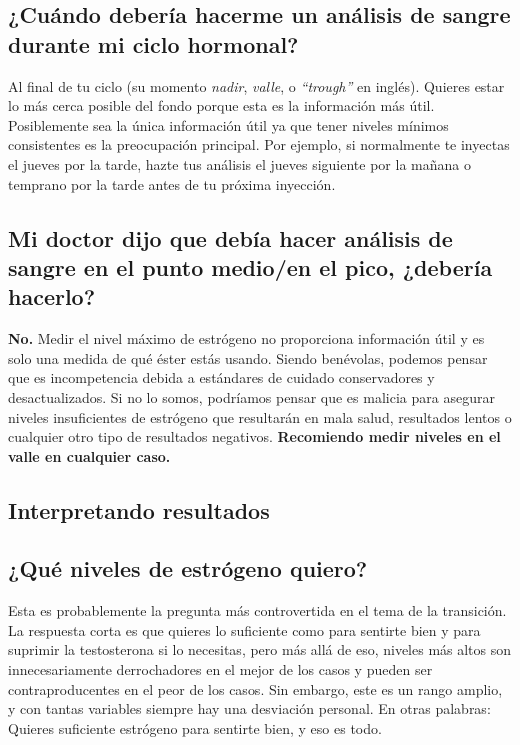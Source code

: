 \documentclass{article}
\begin{document}
\subsection{¿Cuándo debería hacerme un análisis de sangre durante mi ciclo hormonal?}

Al final de tu ciclo (su momento \textit{nadir}, \textit{valle}, o \textit{“trough”} en inglés). Quieres estar lo más cerca posible del fondo porque esta es la información más útil. Posiblemente sea la única información útil ya que tener niveles mínimos consistentes es la preocupación principal. Por ejemplo, si normalmente te inyectas el jueves por la tarde, hazte tus análisis el jueves siguiente por la mañana o temprano por la tarde antes de tu próxima inyección.

\subsection{Mi doctor dijo que debía hacer análisis de sangre en el punto medio/en el pico, ¿debería hacerlo?}

\textbf{No.} Medir el nivel máximo de estrógeno no proporciona información útil y es solo una medida de qué éster estás usando. Siendo benévolas, podemos pensar que es incompetencia debida a estándares de cuidado conservadores y desactualizados. Si no lo somos, podríamos pensar que es malicia para asegurar niveles insuficientes de estrógeno que resultarán en mala salud, resultados lentos o cualquier otro tipo de resultados negativos. \textbf{Recomiendo medir niveles en el valle en cualquier caso.}

\subsection*{Interpretando resultados}

\subsection{¿Qué niveles de estrógeno quiero?}

Esta es probablemente la pregunta más controvertida en el tema de la transición. La respuesta corta es que quieres lo suficiente como para sentirte bien y para suprimir la testosterona si lo necesitas, pero más allá de eso, niveles más altos son innecesariamente derrochadores en el mejor de los casos y pueden ser contraproducentes en el peor de los casos. Sin embargo, este es un rango amplio, y con tantas variables siempre hay una desviación personal. En otras palabras: Quieres suficiente estrógeno para sentirte bien, y eso es todo.
\end{document}
